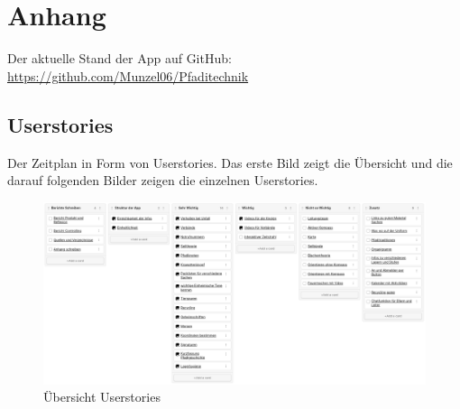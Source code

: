 \chapter{Anhang}
Der aktuelle Stand der App auf GitHub: \url{https://github.com/Munzel06/Pfaditechnik} \\

\section{Userstories}

Der Zeitplan in Form von Userstories. Das erste Bild zeigt die Übersicht und die darauf folgenden Bilder zeigen die einzelnen Userstories.

\begin{figure}[!h]
    \centering
    \includegraphics[width=\textwidth]{Picture/overview.png}
    \caption{Übersicht Userstories}
\end{figure}

